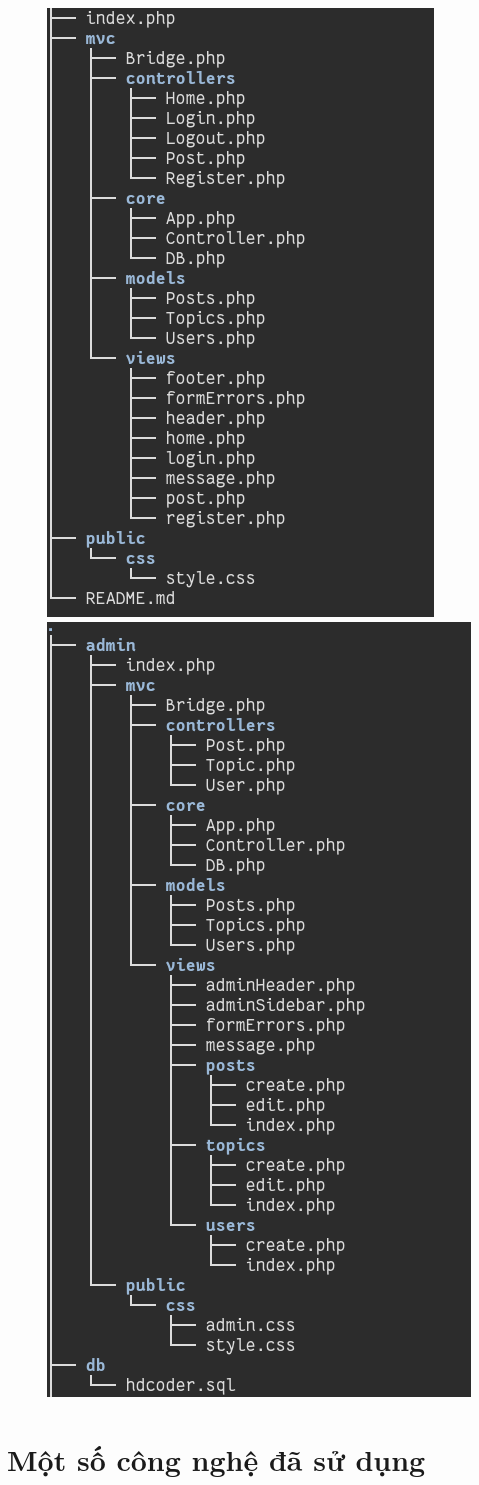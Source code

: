 \documentclass{article}
\begin{document}
\begin{figure}[h]
\includegraphics[width=.5\linewidth]{image/site.png}
\includegraphics[width=.5\linewidth]{image/user.png}
\end{figure}

\newpage

\section*{Một số công nghệ đã sử dụng}
\end{document}
